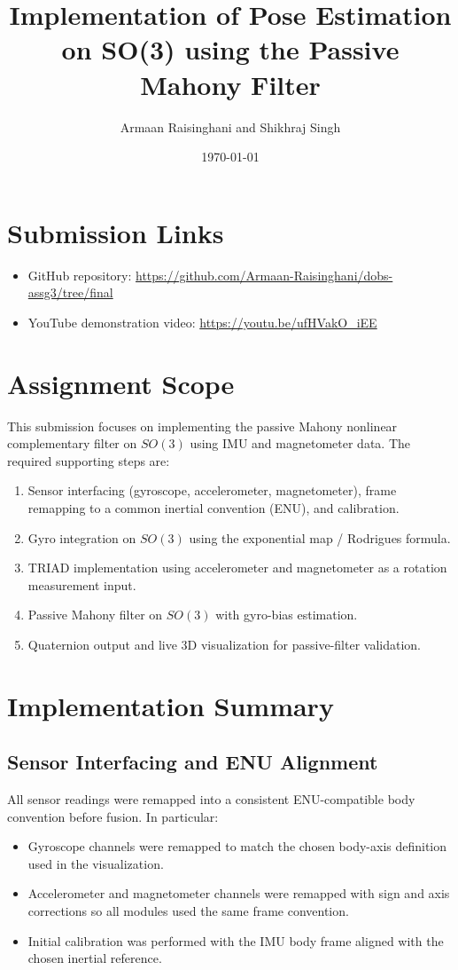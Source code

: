 \documentclass[12pt,a4paper]{article}
\title{Implementation of Pose Estimation on SO(3) using the Passive Mahony Filter}
\author{Armaan Raisinghani and Shikhraj Singh}
\date{\today}
\begin{document}
\maketitle

\section*{Submission Links}
\begin{itemize}[leftmargin=1.5em]
    \item GitHub repository: \url{https://github.com/Armaan-Raisinghani/dobs-assg3/tree/final}
    \item YouTube demonstration video: \url{https://youtu.be/ufHVakO_iEE}
\end{itemize}

\section{Assignment Scope}
This submission focuses on implementing the passive Mahony nonlinear complementary filter on $SO(3)$ using IMU and magnetometer data. The required supporting steps are:
\begin{enumerate}[leftmargin=1.5em]
    \item Sensor interfacing (gyroscope, accelerometer, magnetometer), frame remapping to a common inertial convention (ENU), and calibration.
    \item Gyro integration on $SO(3)$ using the exponential map / Rodrigues formula.
    \item TRIAD implementation using accelerometer and magnetometer as a rotation measurement input.
    \item Passive Mahony filter on $SO(3)$ with gyro-bias estimation.
    \item Quaternion output and live 3D visualization for passive-filter validation.
\end{enumerate}

\section{Implementation Summary}
\subsection{Sensor Interfacing and ENU Alignment}
All sensor readings were remapped into a consistent ENU-compatible body convention before fusion. In particular:
\begin{itemize}[leftmargin=1.5em]
    \item Gyroscope channels were remapped to match the chosen body-axis definition used in the visualization.
    \item Accelerometer and magnetometer channels were remapped with sign and axis corrections so all modules used the same frame convention.
    \item Initial calibration was performed with the IMU body frame aligned with the chosen inertial reference.
\end{itemize}
\end{document}
